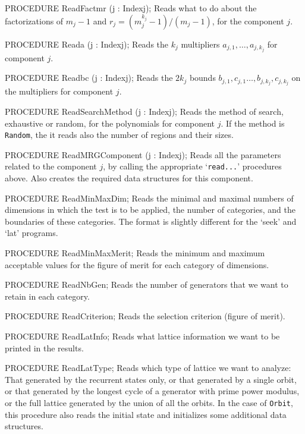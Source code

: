 PROCEDURE ReadFactmr (j : Indexj);
\endcode
 \tab
  Reads what to do about the factorizations of $m_j-1$ and 
  $r_j = (m_j^{k_j}-1)/(m_j-1)$,  for the component $j$.
 \endtab
\code

PROCEDURE Reada (j : Indexj);
\endcode
 \tab
  Reads the $k_j$ multipliers $a_{j,1},\dots,a_{j,k_j}$ for component $j$.
 \endtab
\code

PROCEDURE Readbc (j : Indexj);
\endcode
 \tab
  Reads the $2k_j$ bounds $b_{j,1},c_{j,1}\dots,b_{j,k_j},c_{j,k_j}$ 
  on the multipliers for component $j$.
 \endtab
\code

PROCEDURE ReadSearchMethod (j : Indexj);
\endcode
 \tab
  Reads the method of search, exhaustive or random, for the polynomials
  for component $j$.  If the method is {\tt Random}, the it reads also
  the number of regions and their sizes.
 \endtab
\code

PROCEDURE ReadMRGComponent (j : Indexj);
\endcode
 \tab
  Reads all the parameters related to the component $j$,
  by calling the appropriate `{\tt read...}' procedures above.
  Also creates the required data structures for this component.
 \endtab
\code

PROCEDURE ReadMinMaxDim;
\endcode
 \tab
  Reads the minimal and maximal numbers of dimensions in which the
  test is to be applied, the number of categories,
  and the boundaries of these categories.
  The format is slightly different for the `seek' and `lat'
  programs.
 \endtab
\code

PROCEDURE ReadMinMaxMerit;
\endcode
 \tab
  Reads the minimum and maximum acceptable values for the figure 
  of merit for each category of dimensions.
 \endtab
\code

PROCEDURE ReadNbGen;
\endcode
 \tab
  Reads the number of generators that we want to retain in each
  category.
 \endtab
\code

PROCEDURE ReadCriterion;
\endcode
 \tab
  Reads the selection criterion (figure of merit).
 \endtab
\code

PROCEDURE ReadLatInfo;
\endcode
 \tab
  Reads what lattice information we want to be printed in the results.
 \endtab
\code

PROCEDURE ReadLatType;
\endcode
 \tab
  Reads which type of lattice we want to analyze:
  That generated by the recurrent states only, or that generated by
  a single orbit, or that generated by the longest cycle of a 
  generator with prime power modulus, or the full lattice generated
  by the union of all the orbits.
  In the case of {\tt Orbit}, this procedure also reads the initial
  state and initializes some additional data structures.
 \endtab
\code

